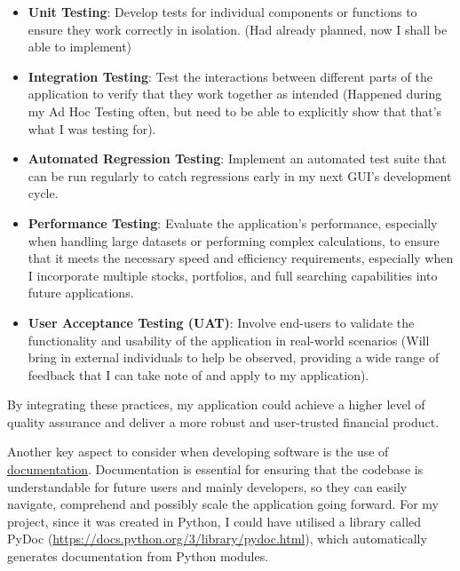 \documentclass{article}
\begin{document}
\begin{itemize}
    \item \textbf{Unit Testing}: Develop tests for individual components or functions to ensure they work correctly in isolation. (Had already planned, now I shall be able to implement)
    \item \textbf{Integration Testing}: Test the interactions between different parts of the application to verify that they work together as intended (Happened during my Ad Hoc Testing often, but need to be able to explicitly show that that's what I was testing for).
    \item \textbf{Automated Regression Testing}: Implement an automated test suite that can be run regularly to catch regressions early in my next GUI's development cycle.
    \item \textbf{Performance Testing}: Evaluate the application's performance, especially when handling large datasets or performing complex calculations, to ensure that it meets the necessary speed and efficiency requirements, especially when I incorporate multiple stocks, portfolios, and full searching capabilities into future applications.
    \item \textbf{User Acceptance Testing (UAT)}: Involve end-users to validate the functionality and usability of the application in real-world scenarios (Will bring in external individuals to help be observed, providing a wide range of feedback that I can take note of and apply to my application).
\end{itemize}

By integrating these practices, my application could achieve a higher level of quality assurance and deliver a more robust and user-trusted financial product.\\\vspace{0.3cm}

Another key aspect to consider when developing software is the use of \underline{documentation}. Documentation is essential for ensuring that the codebase is understandable for future users and mainly developers, so they can easily navigate, comprehend and possibly scale the application going forward. For my project, since it was created in Python, I could have utilised a library called PyDoc (\url{https://docs.python.org/3/library/pydoc.html}), which automatically generates documentation from Python modules.\\\vspace{0.3cm}
\end{document}
